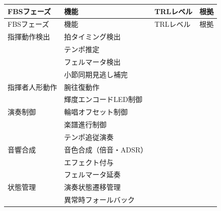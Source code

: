 \begingroup
\small
\begin{longtable}{p{3cm}p{4.5cm}p{1.8cm}p{6cm}}
\toprule
FBSフェーズ & 機能 & TRLレベル & 根拠 \\
\midrule
\endfirsthead

\toprule
FBSフェーズ & 機能 & TRLレベル & 根拠 \\
\midrule
\endhead

\bottomrule
\endfoot

指揮動作検出 & 拍タイミング検出 &  &  \\
 & テンポ推定 &  &  \\
 & フェルマータ検出 &  &  \\
 & 小節同期見逃し補完 &  &  \\
\midrule

指揮者人形動作 & 腕往復動作 &  &  \\
 & 輝度エンコードLED制御 &  &  \\
\midrule

演奏制御 & 輪唱オフセット制御 &  &  \\
 & 楽譜進行制御 &  &  \\
 & テンポ追従演奏 &  &  \\
\midrule

音響合成 & 音色合成（倍音・ADSR） &  &  \\
 & エフェクト付与 &  &  \\
 & フェルマータ延奏 &  &  \\
\midrule

状態管理 & 演奏状態遷移管理 &  &  \\
 & 異常時フォールバック &  &  \\

\end{longtable}
\endgroup
